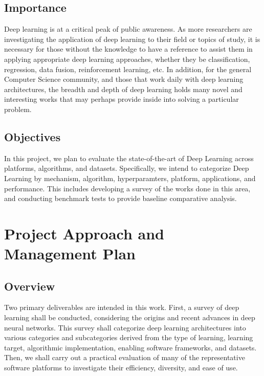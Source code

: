 \documentclass[12pt]{article}
\begin{document}
	\subsection{Importance}\hspace{4ex} Deep learning is at a critical peak of public awareness. As more researchers are investigating the application of deep learning to their field or topics of study, it is necessary for those without the knowledge to have a reference to assist them in applying appropriate deep learning approaches, whether they be classification, regression, data fusion, reinforcement learning, etc. In addition, for the general Computer Science community, and those that work daily with deep learning architectures, the breadth and depth of deep learning holds many novel and interesting works that may perhaps provide inside into solving a particular problem. 
	
	\subsection{Objectives}\hspace{4ex}In this project, we plan to evaluate the state-of-the-art of Deep Learning across platforms, algorithms, and datasets. Specifically, we intend to categorize Deep Learning by mechanism, algorithm, hyperparamters, platform, applications, and performance. This includes developing a survey of the works done in this area, and conducting benchmark tests to provide baseline comparative analysis. 

\section{Project Approach and Management Plan}

	\subsection{Overview}\hspace{4ex}Two primary deliverables are intended in this work. First, a survey of deep learning shall be conducted, considering the origins and recent advances in deep neural networks. This survey shall categorize deep learning architectures into various categories and subcategories derived from the type of learning, learning target, algorithmic implementation, enabling software frameworks, and datasets. Then, we shall carry out a practical evaluation of many of the representative software platforms to investigate their efficiency, diversity, and ease of use. 
	
\end{document}
